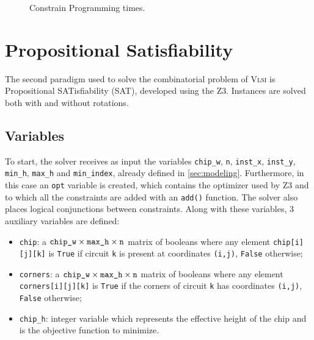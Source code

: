\documentclass[a4paper, 12pt]{article}
\begin{document}
\begin{figure}
    \centering
    \caption{Constrain Programming times.}
    \label{fig:cp}
\end{figure}


\clearpage


\section{Propositional Satisfiability}\label{sec:sat}

The second paradigm used to solve the combinatorial problem of \textsc{Vlsi} is Propositional SATisfiability (SAT), developed using the Z3. Instances are solved both with and without rotations.


\subsection{Variables}\label{sec:sat-variables}

To start, the solver receives as input the variables \verb|chip_w|, \verb|n|, \verb|inst_x|, \verb|inst_y|, \verb|min_h|, \verb|max_h| and \verb|min_index|, already defined in \cref{sec:modeling}. Furthermore, in this case an \verb|opt| variable is created, which contains the optimizer used by Z3 and to which all the constraints are added with an \verb|add()| function. The solver also places logical conjunctions between constraints. Along with these variables, 3 auxiliary variables are defined:
\begin{itemize}
    \item \verb|chip|: a $\texttt{chip\symbol{95}w} \times \texttt{max\symbol{95}h} \times \texttt{n}$ matrix of booleans where any element \verb|chip[i][j][k]| is \verb|True| if circuit \verb|k| is present at coordinates \verb|(i,j)|, \verb|False| otherwise;
    \item \verb|corners|: a $\texttt{chip\symbol{95}w} \times \texttt{max\symbol{95}h} \times \texttt{n}$ matrix of booleans where any element \verb|corners[i][j][k]| is \verb|True| if the corners of circuit \verb|k| has coordinates \verb|(i,j)|, \verb|False| otherwise;
    \item \verb|chip_h|: integer variable which represents the effective height of the chip and is the objective function to minimize.
\end{itemize}
\end{document}

